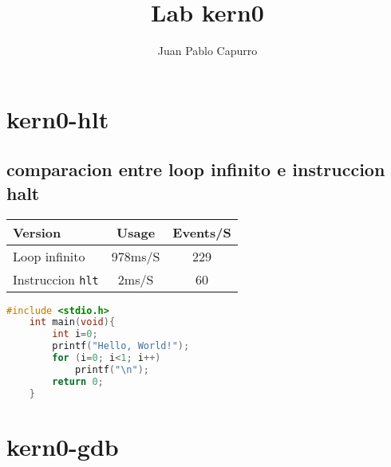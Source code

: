 \documentclass[a4paper]{article}
\title{Lab kern0}
\author {Juan Pablo Capurro}
\newcommand{\code}[1]{\colorbox{light-gray}{\texttt{#1}}}
\begin{document}
\maketitle

\section{kern0-hlt}
\subsection{comparacion entre loop infinito e instruccion halt}
\begin{tabular}{|l|c|c|}
    \hline \textbf{Version}           & \textbf{Usage} & \textbf{Events/S}\\
    \hline Loop infinito              & 978ms/S        & 229\\
    \hline Instruccion \code{hlt} & 2ms/S          & 60 \\
    \hline
\end{tabular}
\bigskip
\begin{lstlisting}[language=C, gobble=4, tabsize=4]
	#include <stdio.h>
	int main(void){
        int i=0;
        printf("Hello, World!");
        for (i=0; i<1; i++)
            printf("\n");
        return 0;
	}
\end{lstlisting}
\section{kern0-gdb}
\end{document}
